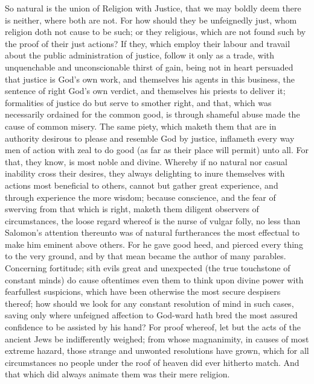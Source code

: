 So natural is the union of Religion with Justice, that we may boldly deem there is neither, where both are not. For how should they be unfeignedly just, whom religion doth not cause to be such; or they religious, which are not found such by the proof of their just actions? If they, which employ their labour and travail about the public administration of justice, follow it only as a trade, with unquenchable and unconscionable thirst of gain, being not in heart persuaded that justice is God’s own work, and themselves his agents in this business, the sentence of right God’s own verdict, and themselves his priests to deliver it; formalities of justice do but serve to smother right, and that, which was necessarily ordained for the common good, is through shameful abuse made the cause of common misery.
The same piety, which maketh them that are in authority desirous to please and resemble God by justice, inflameth  every way men of action with zeal to do good (as far as their place will permit) unto all. For that, they know, is most noble and divine. Whereby if no natural nor casual inability cross their desires, they always delighting to inure themselves with actions most beneficial to others, cannot but gather great experience, and through experience the more wisdom; because conscience, and the fear of swerving from that which is right, maketh them diligent observers of circumstances, the loose regard whereof is the nurse of vulgar folly, no less than Salomon’s attention thereunto was of natural furtherances the most effectual to make him eminent above others. For he gave good heed, and pierced every thing to the very ground, and by that mean became the author of many parables.
Concerning fortitude; sith evils great and unexpected (the true touchstone of constant minds) do cause oftentimes even them to think upon divine power with fearfullest suspicions, which have been otherwise the most secure despisers thereof; how should we look for any constant resolution of mind in such cases, saving only where unfeigned affection to God-ward hath bred the most assured confidence to be assisted by his hand? For proof whereof, let but the acts of the ancient Jews be indifferently weighed; from whose magnanimity, in causes of most extreme hazard, those strange and unwonted resolutions have grown, which for all circumstances no people under the roof of heaven did ever hitherto match. And that which did always animate them was their mere religion.
